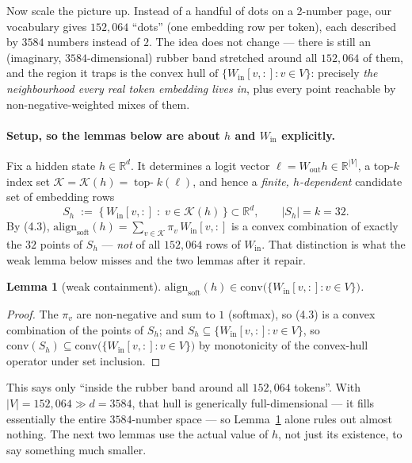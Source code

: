 \documentclass[11pt]{article}
\newtheorem{lemma}[theorem]{Lemma}
\theoremstyle{definition}
\begin{document}
Now scale the picture up. Instead of a handful of dots on a 2-number page, our vocabulary gives $152{,}064$ ``dots'' (one embedding row per token), each described by $3584$ numbers instead of $2$. The idea does not change --- there is still an (imaginary, $3584$-dimensional) rubber band stretched around all $152{,}064$ of them, and the region it traps is $\text{the convex hull of } \{W_{\mathrm{in}}[v,:] : v \in V\}$: precisely \emph{the neighbourhood every real token embedding lives in}, plus every point reachable by non-negative-weighted mixes of them.

\paragraph{Setup, so the lemmas below are about $h$ and $W_{\mathrm{in}}$ explicitly.} Fix a hidden state $h\in\mathbb{R}^d$. It determines a logit vector $\ell = W_{\mathrm{out}}h \in \mathbb{R}^{|V|}$, a top-$k$ index set $\mathcal{K} = \mathcal{K}(h) = \operatorname{top-}k(\ell)$, and hence a \emph{finite, $h$-dependent} candidate set of embedding rows
\[
S_h \;:=\; \{\,W_{\mathrm{in}}[v,:] \;:\; v \in \mathcal{K}(h)\,\} \subset \mathbb{R}^d,
\qquad |S_h| = k = 32.
\]
By (4.3), $\mathrm{align}_{\mathrm{soft}}(h) = \sum_{v\in\mathcal{K}}\pi_v\,W_{\mathrm{in}}[v,:]$ is a convex combination of exactly the $32$ points of $S_h$ --- \emph{not} of all $152{,}064$ rows of $W_{\mathrm{in}}$. That distinction is what the weak lemma below misses and the two lemmas after it repair.

\begin{lemma}[weak containment]
\label{lem:hull-weak}
$\mathrm{align}_{\mathrm{soft}}(h) \in \mathrm{conv}\big(\{W_{\mathrm{in}}[v,:]:v\in V\}\big)$.
\end{lemma}
\begin{proof}
The $\pi_v$ are non-negative and sum to $1$ (softmax), so (4.3) is a convex combination of the points of $S_h$; and $S_h \subseteq \{W_{\mathrm{in}}[v,:]:v\in V\}$, so $\mathrm{conv}(S_h)\subseteq\mathrm{conv}\big(\{W_{\mathrm{in}}[v,:]:v\in V\}\big)$ by monotonicity of the convex-hull operator under set inclusion.
\end{proof}

This says only ``inside the rubber band around all $152{,}064$ tokens''. With $|V|=152{,}064 \gg d=3584$, that hull is generically full-dimensional --- it fills essentially the entire $3584$-number space --- so Lemma~\ref{lem:hull-weak} alone rules out almost nothing. The next two lemmas use the actual value of $h$, not just its existence, to say something much smaller.
\end{document}
